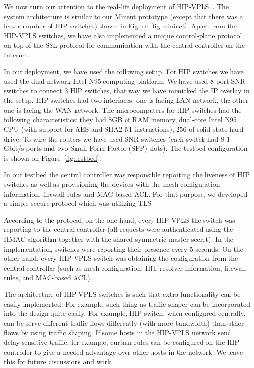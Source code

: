 We now turn our attention to the real-life deployment 
of HIP-VPLS~\cite{hipvpls-hw, hipvpls-controller}. The system architecture is similar to our Minent prototype
(except that there was a lesser number of HIP switches) shown in Figure~\ref{fig:mininet}. 
Apart from the HIP-VPLS switches, we have also implemented a unique 
control-plane protocol on top of the SSL protocol for communication 
with the central controller on the Internet.

In our deployment, we have used the following setup. For HIP switches we 
have used the dual-network Intel N95 computing platform. We have used $8$ 
port SNR switches to connect $3$ HIP switches, that way we have mimicked the 
IP overlay in the setup. HIP switches had two interfaces: one is facing 
LAN network, the other one is facing the WAN network. The microcomputers for
HIP switches had the following characteristics: they had $8$GB of RAM memory, 
dual-core Intel N95 CPU (with support for AES and SHA2 NI instructions), $256$ of 
solid state hard drive. To wire the routers we have used SNR switches 
(each switch had $8$ $1$ Gbit/s ports and two Small Form Factor (SFP) slots). 
The testbed configuration is shown on Figure~\ref{fig:testbed}.

In our testbed the central controller was responsible 
reporting the liveness of HIP switches as well as provisioning 
the devices with the mesh configuration information, firewall rules 
and MAC-based ACL. For that purpose, we developed a simple 
secure protocol which was utilizing TLS.

According to the protocol, on the one hand, every HIP-VPLS 
the switch was reporting to the central controller (all requests were authenticated 
using the HMAC algorithm together with the shared symmetric 
master secret). In the implementation, switches were reporting 
their presence every $5$ seconds. On the other hand, every HIP-VPLS switch was obtaining 
the configuration from the central controller (such as mesh 
configuration, HIT resolver information, firewall rules, and 
MAC-based ACL). 

{\eat 
The architecture of HIP-VPLS switches is such
that extra functionality can be easily implemented. For example,
such thing as traffic shaper can be incorporated into the design
quite easily. For example, HIP-switch, when configured centrally, 
can be serve different traffic flows differently (with more bandwidth) than other 
flows by using traffic shaping. If some hosts in the HIP-VPLS network send delay-sensitive traffic, 
for example, curtain rules can be configured on the HIP controller 
to give a needed advantage over other hosts in the network. We 
leave this for future discussions and work.
}

